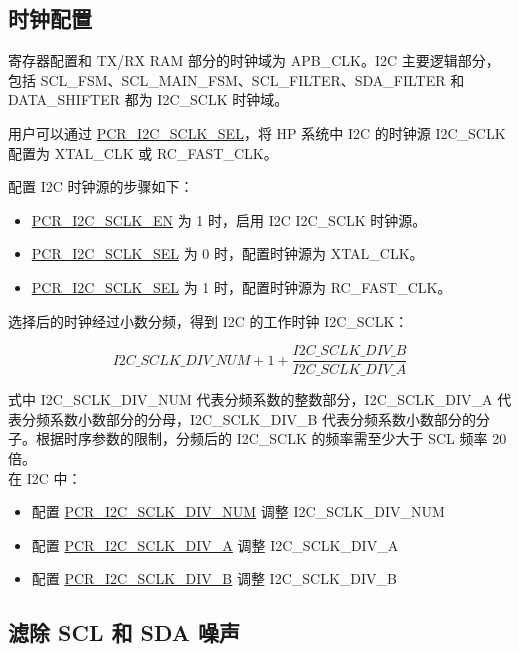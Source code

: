\documentclass[main\_\_CN.tex]{subfiles}
\begin{document}
\subsection{时钟配置}

寄存器配置和 TX/RX RAM 部分的时钟域为 APB\_CLK。I2C 主要逻辑部分，包括 SCL\_FSM、SCL\_MAIN\_FSM、SCL\_FILTER、SDA\_FILTER 和 DATA\_SHIFTER 都为 I2C\_SCLK 时钟域。

用户可以通过 \hyperref[fielddesc:PCRI2CSCLKSEL]{PCR\_I2C\_SCLK\_SEL}，将 HP 系统中 I2C 的时钟源 I2C\_SCLK 配置为 XTAL\_CLK 或 RC\_FAST\_CLK。

配置 I2C 时钟源的步骤如下：

\begin{itemize}
    \item \hyperref[fielddesc:PCRI2CSCLKEN]{PCR\_I2C\_SCLK\_EN} 为 1 时，启用 I2C I2C\_SCLK 时钟源。
    \item \hyperref[fielddesc:PCRI2CSCLKSEL]{PCR\_I2C\_SCLK\_SEL} 为 0 时，配置时钟源为 XTAL\_CLK。
    \item \hyperref[fielddesc:PCRI2CSCLKSEL]{PCR\_I2C\_SCLK\_SEL} 为 1 时，配置时钟源为 RC\_FAST\_CLK。
\end{itemize}

选择后的时钟经过小数分频，得到 I2C 的工作时钟 I2C\_SCLK：

\begin{equation*}
I2C\_SCLK\_DIV\_NUM + 1+\frac{ I2C\_SCLK\_DIV\_B}{I2C\_SCLK\_DIV\_A}
\end{equation*}

式中 I2C\_SCLK\_DIV\_NUM 代表分频系数的整数部分，I2C\_SCLK\_DIV\_A 代表分频系数小数部分的分母，I2C\_SCLK\_DIV\_B 代表分频系数小数部分的分子。根据时序参数的限制，分频后的 I2C\_SCLK 的频率需至少大于 SCL 频率 20 倍。\\

在 I2C 中：

\begin{itemize}
    \item 配置 \hyperref[fielddesc:PCRI2CSCLKDIVNUM]{PCR\_I2C\_SCLK\_DIV\_NUM} 调整 I2C\_SCLK\_DIV\_NUM
    \item 配置 \hyperref[fielddesc:PCRI2CSCLKDIVA]{PCR\_I2C\_SCLK\_DIV\_A} 调整 I2C\_SCLK\_DIV\_A
    \item 配置 \hyperref[fielddesc:PCRI2CSCLKDIVB]{PCR\_I2C\_SCLK\_DIV\_B} 调整 I2C\_SCLK\_DIV\_B
\end{itemize}

\subsection{滤除 SCL 和 SDA 噪声}
\end{document}
